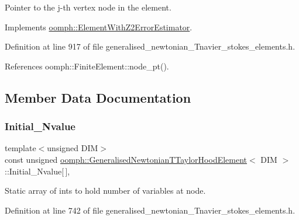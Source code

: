 Pointer to the j-\/th vertex node in the element. 



Implements \hyperlink{classoomph_1_1ElementWithZ2ErrorEstimator_a0eedccc33519f852c5dc2055ddf2774b}{oomph\+::\+Element\+With\+Z2\+Error\+Estimator}.



Definition at line 917 of file generalised\+\_\+newtonian\+\_\+\+Tnavier\+\_\+stokes\+\_\+elements.\+h.



References oomph\+::\+Finite\+Element\+::node\+\_\+pt().



\subsection{Member Data Documentation}
\mbox{\label{classoomph_1_1GeneralisedNewtonianTTaylorHoodElement_a2037dd72fff542c5976df782653378be}} 
\subsubsection{\texorpdfstring{Initial\+\_\+\+Nvalue}{Initial\_Nvalue}}
{\footnotesize\ttfamily template$<$unsigned D\+IM$>$ \\
const unsigned \hyperlink{classoomph_1_1GeneralisedNewtonianTTaylorHoodElement}{oomph\+::\+Generalised\+Newtonian\+T\+Taylor\+Hood\+Element}$<$ D\+IM $>$\+::Initial\+\_\+\+Nvalue\mbox{[}$\,$\mbox{]}\hspace{0.3cm}{\ttfamily [static]}, {\ttfamily [private]}}



Static array of ints to hold number of variables at node. 



Definition at line 742 of file generalised\+\_\+newtonian\+\_\+\+Tnavier\+\_\+stokes\+\_\+elements.\+h.

\mbox{\label{classoomph_1_1GeneralisedNewtonianTTaylorHoodElement_a7a86c1512d4f24cc56ddb2dc1fffc095}} 
